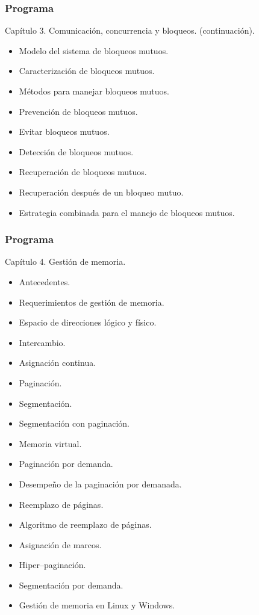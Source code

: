\documentclass[xcolor=svgnames]{beamer}
\theoremstyle{example}
\begin{document}
\begin{frame}
  \frametitle{Programa}
  \begin{block}{Capítulo 3. Comunicación, concurrencia y bloqueos. \tiny{(continuación).}}
    \begin{itemize}%
    \item Modelo del sistema de bloqueos mutuos.
    \item Caracterización de bloqueos mutuos.
    \item Métodos para manejar bloqueos mutuos.
    \item Prevención de bloqueos mutuos.
    \item Evitar bloqueos mutuos.
    \item Detección de bloqueos mutuos.
    \item Recuperación de bloqueos mutuos.
    \item Recuperación después de un bloqueo mutuo.
    \item Estrategia combinada para el manejo de bloqueos mutuos.
    \end{itemize}
  \end{block}
\end{frame}

\begin{frame}[shrink]
  \frametitle{Programa}
  \begin{block}{Capítulo 4. Gestión de memoria.}
    \begin{itemize}%
    \item Antecedentes.
    \item Requerimientos de gestión de memoria.
    \item Espacio de direcciones lógico y físico.
    \item Intercambio.
    \item Asignación continua.
    \item Paginación.
    \item Segmentación.
    \item Segmentación con paginación.
    \item Memoria virtual.
    \item Paginación por demanda.
    \item Desempeño de la paginación por demanada.
    \item Reemplazo de páginas.
    \item Algoritmo de reemplazo de páginas.
    \item Asignación de marcos.
    \item Hiper--paginación.
    \item Segmentación por demanda.
    \item Gestión de memoria en Linux y Windows.
    \end{itemize}
  \end{block}
\end{frame}
\end{document}
